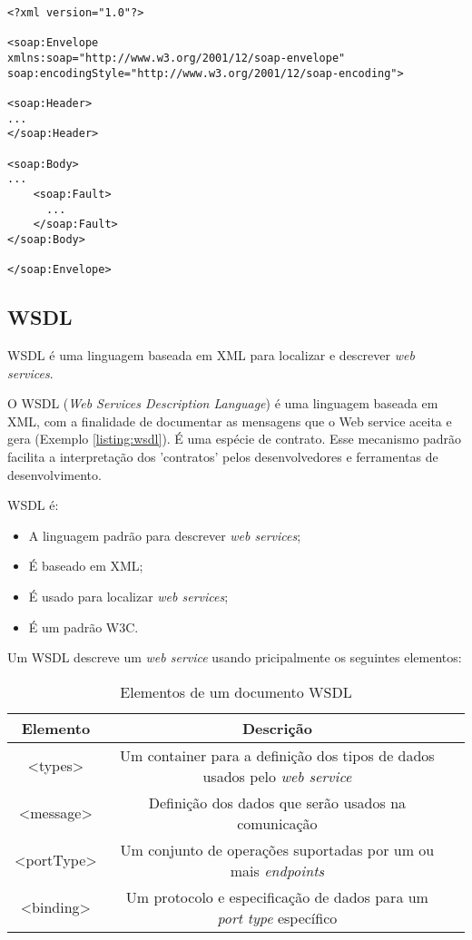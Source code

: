 \lstset{language=XML}
\begin{lstlisting}[caption={Estrutura de uma mensagem SOAP},frame=trBL,breaklines=true,label=listing:msgsoap]
<?xml version="1.0"?>

<soap:Envelope
xmlns:soap="http://www.w3.org/2001/12/soap-envelope"
soap:encodingStyle="http://www.w3.org/2001/12/soap-encoding">

<soap:Header>
...
</soap:Header>

<soap:Body>
...  
	<soap:Fault>
	  ...  
	</soap:Fault>
</soap:Body>

</soap:Envelope>
\end{lstlisting}

\subsection{WSDL}

WSDL é uma linguagem baseada em XML para localizar e descrever \textit{web services}.

O WSDL (\textit{Web Services Description Language}) é uma linguagem baseada em XML, com a finalidade de documentar as mensagens que o Web service aceita e gera (Exemplo \ref{listing:wsdl}). É uma espécie de contrato. Esse mecanismo padrão facilita a interpretação dos 'contratos' pelos desenvolvedores e ferramentas de desenvolvimento. 

WSDL é:

\begin {itemize}
	\item A linguagem padrão para descrever \textit{web services};
	\item É baseado em XML;
	\item É usado para localizar \textit{web services};
	\item É um padrão W3C.
\end {itemize}

Um WSDL descreve um \textit{web service} usando pricipalmente os seguintes elementos:

\begin{table}[h]
	\caption{Elementos de um documento WSDL}
	\begin{center}
	\begin{tabular}{ccc}
		\hline
			\textbf{Elemento} & \textbf{Descrição} \\
		\hline
			<types> & Um container para a definição dos tipos de dados usados pelo \textit{web service}\\
			<message> & Definição dos dados que serão usados na comunicação \\
			<portType> & Um conjunto de operações suportadas por um ou mais \textit{endpoints} \\
			<binding> & Um protocolo e especificação de dados para um \textit{port type} específico\\
		\hline
	\end {tabular}
	\end{center}
	\label{tab:elementosWsdl}
\end{table}

